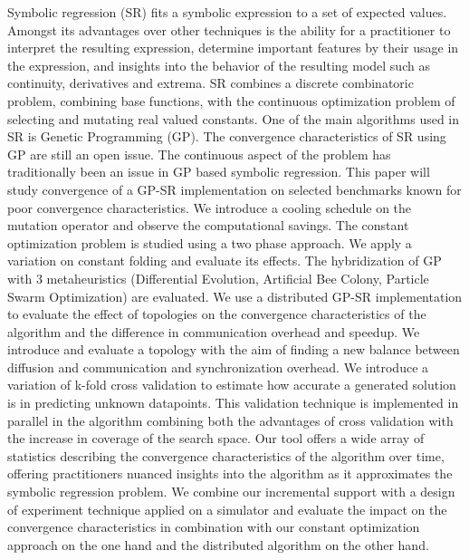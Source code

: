 
Symbolic regression (SR) fits a symbolic expression to a set of expected values.
Amongst its advantages over other techniques is the ability for a practitioner to interpret the resulting expression, determine important features by their usage in the expression, and insights into the behavior of the resulting model such as continuity, derivatives and extrema.
SR combines a discrete combinatoric problem, combining base functions, with the continuous optimization problem of selecting and mutating real valued constants.
One of the main algorithms used in SR is Genetic Programming (GP). The convergence characteristics of SR using GP are still an open issue.
The continuous aspect of the problem has traditionally been an issue in GP based symbolic regression. This paper will study convergence of a GP-SR implementation on selected benchmarks known for poor convergence characteristics.
We introduce a cooling schedule on the mutation operator and observe the computational savings.
The constant optimization problem is studied using a two phase approach. We apply a variation on constant folding and evaluate its effects. The hybridization of GP with 3 metaheuristics (Differential Evolution, Artificial Bee Colony, Particle Swarm Optimization) are evaluated. 
We use a distributed GP-SR implementation to evaluate the effect of topologies on the convergence characteristics of the algorithm and the difference in communication overhead and speedup.
We introduce and evaluate a topology with the aim of finding a new balance between diffusion and communication and synchronization overhead.
We introduce a variation of k-fold cross validation to estimate how accurate a generated solution is in predicting unknown datapoints. This validation technique is implemented in parallel in the algorithm combining both the advantages of cross validation with the increase in coverage of the search space.
Our tool offers a wide array of statistics describing the convergence characteristics of the algorithm over time, offering practitioners nuanced insights into the algorithm as it approximates the symbolic regression problem.
We combine our incremental support with a design of experiment technique applied on a simulator and evaluate the impact on the convergence characteristics in combination with our constant optimization approach on the one hand and the distributed algorithm on the other hand.